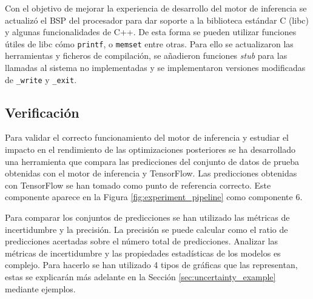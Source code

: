 Con el objetivo de mejorar la experiencia de desarrollo del motor de inferencia se actualizó el BSP del procesador para dar soporte a la biblioteca estándar C (libc) y algunas funcionalidades de C++. De esta forma se pueden utilizar funciones útiles de libc cómo \texttt{printf}, o \texttt{memset} entre otras. Para ello se actualizaron las herramientas y ficheros de compilación, se añadieron funciones \textit{stub} para las llamadas al sistema no implementadas y se implementaron versiones modificadas de \texttt{\_write} y \texttt{\_exit}.

\subsection{Verificación}

Para validar el correcto funcionamiento del motor de inferencia y estudiar el impacto en el rendimiento de las optimizaciones posteriores se ha desarrollado una herramienta que compara las predicciones del conjunto de datos de prueba obtenidas con el motor de inferencia y TensorFlow. Las predicciones obtenidas con TensorFlow se han tomado como punto de referencia correcto. Este componente aparece en la Figura \ref{fig:experiment_pipeline} como componente 6.

Para comparar los conjuntos de predicciones se han utilizado las métricas de incertidumbre y la precisión. La precisión se puede calcular como el ratio de predicciones acertadas sobre el número total de predicciones. Analizar las métricas de incertidumbre y las propiedades estadísticas de los modelos es complejo. Para hacerlo se han utilizado 4 tipos de gráficas que las representan, estas se explicarán más adelante en la Sección \ref{sec:uncertainty_example} mediante ejemplos.
